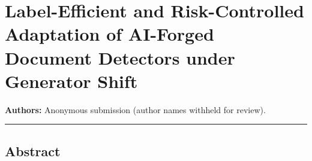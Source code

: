 \section{Label-Efficient and Risk-Controlled Adaptation of AI-Forged Document Detectors under Generator Shift}\label{label-efficient-and-risk-controlled-adaptation-of-ai-forged-document-detectors-under-generator-shift}

\textbf{Authors:} Anonymous submission (author names withheld for review).

\begin{center}\rule{0.5\linewidth}{0.5pt}\end{center}

\subsection{Abstract}\label{abstract}

